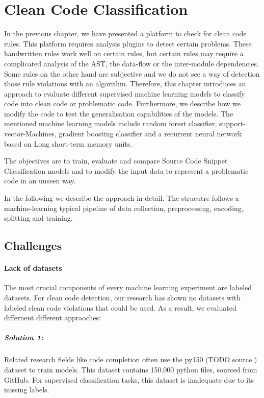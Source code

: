 \section{Clean Code Classification}\label{chap:clean_code_classification}
In the previous chapter, we have presented a platform to check for clean code rules. This platform requires analysis plugins to detect certain problems. These handwritten rules work well on certain rules, but certain rules may require a complicated analysis of the AST, the data-flow or the inter-module dependencies. Some rules on the other hand are subjective and we do not see a way of detection those rule violations with an algorithm.
Therefore, this chapter introduces an approach to evaluate different supervised machine learning models to classify code into clean code or problematic code. Furthermore, we describe how we modify the code to test the generalisation capabilities of the models. The mentioned machine learning models include random forest classifier, support-vector-Machines, gradient boosting classifier and a recurrent neural network based on Long short-term memory units. 

The objectives are to train, evaluate and compare Source Code Snippet Classification models and to modify the input data to represent a problematic code in an unseen way.

In the following we describe the approach in detail. The strucutre follows a machine-learning typical pipeline of data collection, preprocessing, encoding, splitting and training. 

\subsection{Challenges}
\paragraph{Lack of datasets}
The most crucial components of every machine learning experiment are labeled datasets. For clean code detection, our research has shown no datasets with labeled clean code violations that could be used.
As a result, we evaluated differnent different appraoches:

\subparagraph{Solution 1:}
Related research fields like code completion often use the py150 (TODO source ) dataset to train models. This dataset contains 150.000 python files, sourced from GitHub. For supervised classification tasks, this dataset is inadequate due to its missing labels.  


